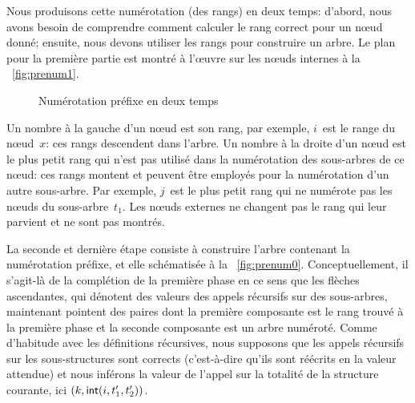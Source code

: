 Nous produisons cette numérotation (des rangs) en deux temps: d'abord,
nous avons besoin de comprendre comment calculer le rang correct pour
un nœud donné; ensuite, nous devons utiliser les rangs pour
construire un arbre. Le plan pour la première partie est montré à
l'œuvre sur les nœuds internes à la \fig~\vref{fig:prenum1}.
\begin{figure}[b]
\centering
{}
\qquad
{}
\caption{Numérotation préfixe en deux temps}
\label{fig:prenum}
\end{figure}
Un nombre à la gauche d'un nœud est son rang, par exemple,
\(i\)~est le range du nœud~\(x\): ces rangs descendent dans
l'arbre. Un nombre à la droite d'un nœud est le plus petit rang
qui n'est pas utilisé dans la numérotation des sous-arbres de ce
nœud: ces rangs montent et peuvent être employés pour la
numérotation d'un autre sous-arbre. Par exemple, \(j\)~est le plus
petit rang qui ne numérote pas les nœuds du
sous-arbre~\(t_1\). Les nœuds externes ne changent pas le rang qui
leur parvient et ne sont pas montrés.

La seconde et dernière étape consiste à construire l'arbre contenant
la numérotation préfixe, et elle schématisée à la
\fig~\vref{fig:prenum0}. Conceptuellement, il s'agit-là de la
complétion de la première phase en ce sens que les flèches
ascendantes, qui dénotent des valeurs des appels récursifs sur des
sous-arbres, maintenant pointent des paires dont la première
composante est le rang trouvé à la première phase et la seconde
composante est un arbre numéroté. Comme d'habitude avec les
définitions récursives, nous supposons que les appels récursifs sur
les sous-structures sont corrects (c'est-à-dire qu'ils sont réécrits
en la valeur attendue) et nous inférons la valeur de l'appel sur la
totalité de la structure courante, ici
\(({k},{\textsf{int}(i,t'_1,t'_2)})\).

